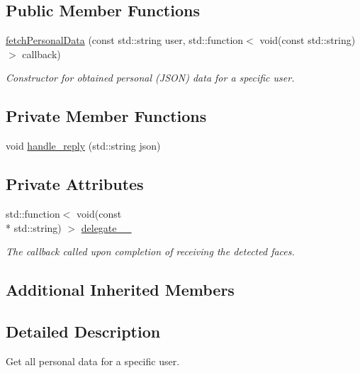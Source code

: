 \subsection*{Public Member Functions}
\begin{DoxyCompactItemize}
\item 
\hyperlink{classrapp_1_1cloud_1_1fetchPersonalData_aeb9e23b12728550bc41683cded3174ad}{fetch\-Personal\-Data} (const std\-::string user, std\-::function$<$ void(const std\-::string) $>$ callback)
\begin{DoxyCompactList}\small\item\em Constructor for obtained personal (J\-S\-O\-N) data for a specific user. \end{DoxyCompactList}\end{DoxyCompactItemize}
\subsection*{Private Member Functions}
\begin{DoxyCompactItemize}
\item 
void \hyperlink{classrapp_1_1cloud_1_1fetchPersonalData_aa8df18d0cafd269ec4dcfbf5c4f44aa1}{handle\-\_\-reply} (std\-::string json)
\end{DoxyCompactItemize}
\subsection*{Private Attributes}
\begin{DoxyCompactItemize}
\item 
std\-::function$<$ void(const \\*
std\-::string) $>$ \hyperlink{classrapp_1_1cloud_1_1fetchPersonalData_a5ab89d0793a2d34182b13b4a4031e93d}{delegate\-\_\-\-\_\-}
\begin{DoxyCompactList}\small\item\em The callback called upon completion of receiving the detected faces. \end{DoxyCompactList}\end{DoxyCompactItemize}
\subsection*{Additional Inherited Members}


\subsection{Detailed Description}
Get all personal data for a specific user. 

